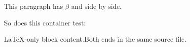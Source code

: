 This paragraph has \(\beta\) and  side by side.

So does this container test:


LaTeX-only block content.Both ends in the same source file.


